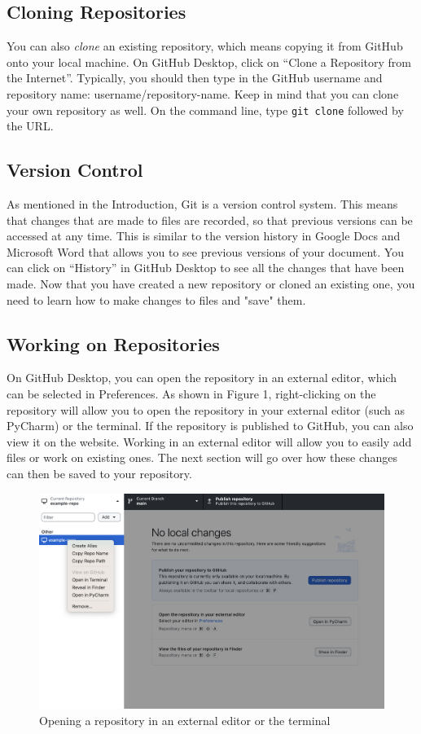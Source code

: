 \documentclass[10pt,twocolumn]{article}
\begin{document}
\subsection{Cloning Repositories}

You can also \textit{clone} an existing repository, which means copying it from GitHub onto your local machine. On GitHub Desktop, click on “Clone a Repository from the Internet”. Typically, you should then type in the GitHub username and repository name: username/repository-name. Keep in mind that you can clone your own repository as well. On the command line, type \texttt{git clone} followed by the URL.

\subsection{Version Control}

As mentioned in the Introduction, Git is a version control system. This means that changes that are made to files are recorded, so that previous versions can be accessed at any time. This is similar to the version history in Google Docs and Microsoft Word that allows you to see previous versions of your document. You can click on “History” in GitHub Desktop to see all the changes that have been made. Now that you have created a new repository or cloned an existing one, you need to learn how to make changes to files and "save" them. 

\subsection{Working on Repositories}

On GitHub Desktop, you can open the repository in an external editor, which can be selected in Preferences. As shown in Figure 1, right-clicking on the repository will allow you to open the repository in your external editor (such as PyCharm) or the terminal. If the repository is published to GitHub, you can also view it on the website. Working in an external editor will allow you to easily add files or work on existing ones. The next section will go over how these changes can then be saved to your repository.

\begin{figure}
    \centering
    \includegraphics[width=.95\linewidth]{external_editor.png}
    \caption{
        Opening a repository in an external editor or the terminal
    }
    \label{fig:first-page}
\end{figure}
\end{document}
